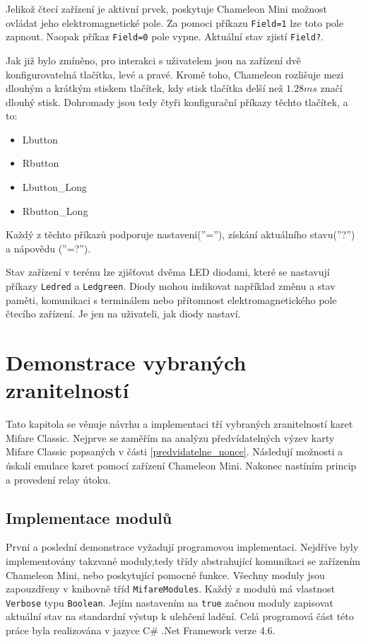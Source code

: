 Jelikož čtecí zařízení je aktivní prvek, poskytuje Chameleon Mini možnost ovládat jeho elektromagnetické pole. Za pomoci příkazu \verb|Field=1| lze toto pole zapnout. Naopak příkaz \verb|Field=0| pole vypne. Aktuální stav zjistí \verb|Field?|.\par
Jak již bylo zmíněno, pro interakci s uživatelem jsou na zařízení dvě konfigurovatelná tlačítka, levé a pravé. Kromě toho, Chameleon rozlišuje mezi dlouhým a krátkým stiskem tlačítek, kdy stisk tlačítka delší než $1.28ms$ značí dlouhý stisk. Dohromady jsou tedy čtyři konfigurační příkazy těchto tlačítek, a to:
\begin{itemize}
\item Lbutton
\item Rbutton
\item {Lbutton\_Long}
\item {Rbutton\_Long}
\end{itemize}
Každý z těchto příkazů podporuje nastavení(''=''), získání aktuálního stavu(''?'') a nápovědu (''=?''). \par
Stav zařízení v terénu lze zjišťovat dvěma LED diodami, které se nastavují příkazy \verb|Ledred| a \verb|Ledgreen|. Diody mohou indikovat například změnu a stav paměti, komunikaci s terminálem nebo přítomnost elektromagnetického pole čtecího zařízení. Je jen na uživateli, jak diody nastaví.\cite{ChameleonDocs}

    \chapter{Demonstrace vybraných zranitelností}
Tato kapitola se věnuje návrhu a implementaci tří vybraných zranitelností karet Mifare Classic. Nejprve se zaměřím na analýzu předvídatelných výzev karty Mifare Classic popsaných v části \ref{predvidatelne_nonce}. Následují možnosti a úskalí emulace karet pomocí zařízení Chameleon Mini. Nakonec nastíním princip a provedení relay útoku.\par 

\section{Implementace modulů}
\label{implementaceModulu}
První a poslední demonstrace vyžadují programovou implementaci. Nejdříve byly implementovány takzvané moduly,tedy třídy abstrahující komunikaci se zařízením Chameleon Mini, nebo poskytující pomocné funkce. Všechny moduly jsou zapouzdřeny v knihovně tříd \verb|MifareModules|. Každý z modulů má vlastnost \verb|Verbose| typu \verb|Boolean|. Jejím nastavením na \verb|true| začnou moduly zapisovat aktuální stav na standardní výstup k ulehčení ladění. Celá programová část této práce byla realizována v jazyce C\# .Net Framework verze 4.6.

